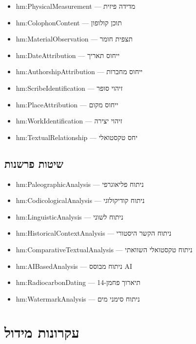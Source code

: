 \documentclass[12pt,a4paper]{article}
\newcommand{\new}[1]{\textcolor{newaddition}{#1}}
\begin{document}
\begin{itemize}
\item \new{hm:PhysicalMeasurement — מדידה פיזית}
\item \new{hm:ColophonContent — תוכן קולופון}
\item \new{hm:MaterialObservation — תצפית חומר}
\item \new{hm:DateAttribution — ייחוס תאריך}
\item \new{hm:AuthorshipAttribution — ייחוס מחברות}
\item \new{hm:ScribeIdentification — זיהוי סופר}
\item \new{hm:PlaceAttribution — ייחוס מקום}
\item \new{hm:WorkIdentification — זיהוי יצירה}
\item \new{hm:TextualRelationship — יחס טקסטואלי}
\end{itemize}

\subsection{\new{שיטות פרשנות}}

\begin{itemize}
\item \new{hm:PaleographicAnalysis — ניתוח פליאוגרפי}
\item \new{hm:CodicologicalAnalysis — ניתוח קודיקולוגי}
\item \new{hm:LinguisticAnalysis — ניתוח לשוני}
\item \new{hm:HistoricalContextAnalysis — ניתוח הקשר היסטורי}
\item \new{hm:ComparativeTextualAnalysis — ניתוח טקסטואלי השוואתי}
\item \new{hm:AIBasedAnalysis — ניתוח מבוסס AI}
\item \new{hm:RadiocarbonDating — תיארוך פחמן-14}
\item \new{hm:WatermarkAnalysis — ניתוח סימני מים}
\end{itemize}

\newpage

\section{עקרונות מידול}
\end{document}
